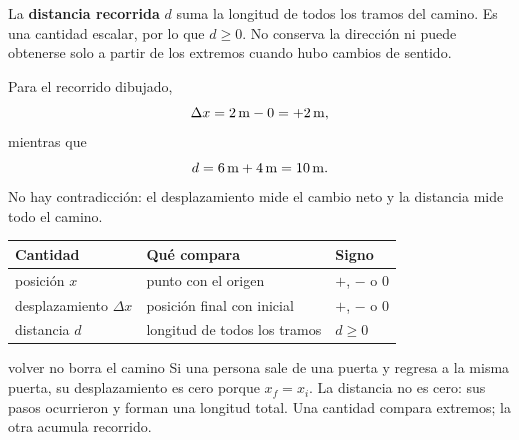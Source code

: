 \documentclass[11pt]{article}
\begin{document}
La \textbf{distancia recorrida} \(d\) suma la longitud de todos los tramos del
camino. Es una cantidad escalar, por lo que \(d\geq0\). No conserva la
dirección ni puede obtenerse solo a partir de los extremos cuando hubo cambios
de sentido.

\begin{center}
\end{center}

Para el recorrido dibujado,
\[
  \Delta x=2\,\mathrm{m}-0=+2\,\mathrm{m},
\]
mientras que
\[
  d=6\,\mathrm{m}+4\,\mathrm{m}=10\,\mathrm{m}.
\]
No hay contradicción: el desplazamiento mide el cambio neto y la distancia
mide todo el camino.

\begin{center}
\begin{tabular}{lll}
\toprule
Cantidad & Qué compara & Signo \\
\midrule
posición \(x\) & punto con el origen & \(+\), \(-\) o \(0\) \\
desplazamiento \(\Delta x\) & posición final con inicial & \(+\), \(-\) o \(0\) \\
distancia \(d\) & longitud de todos los tramos & \(d\geq0\) \\
\bottomrule
\end{tabular}
\end{center}

\begin{ejemplocualitativo}{volver no borra el camino}
Si una persona sale de una puerta y regresa a la misma puerta, su
desplazamiento es cero porque \(x_f=x_i\). La distancia no es cero: sus pasos
ocurrieron y forman una longitud total. Una cantidad compara extremos; la otra
acumula recorrido.
\end{ejemplocualitativo}
\end{document}
